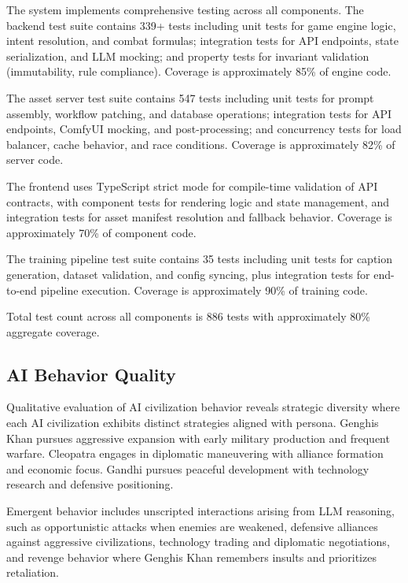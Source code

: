 \documentclass[conference]{IEEEtran}
\begin{document}
The system implements comprehensive testing across all components. The backend test suite contains 339+ tests including unit tests for game engine logic, intent resolution, and combat formulas; integration tests for API endpoints, state serialization, and LLM mocking; and property tests for invariant validation (immutability, rule compliance). Coverage is approximately 85\% of engine code.

The asset server test suite contains 547 tests including unit tests for prompt assembly, workflow patching, and database operations; integration tests for API endpoints, ComfyUI mocking, and post-processing; and concurrency tests for load balancer, cache behavior, and race conditions. Coverage is approximately 82\% of server code.

The frontend uses TypeScript strict mode for compile-time validation of API contracts, with component tests for rendering logic and state management, and integration tests for asset manifest resolution and fallback behavior. Coverage is approximately 70\% of component code.

The training pipeline test suite contains 35 tests including unit tests for caption generation, dataset validation, and config syncing, plus integration tests for end-to-end pipeline execution. Coverage is approximately 90\% of training code.

Total test count across all components is 886 tests with approximately 80\% aggregate coverage.

\subsection{AI Behavior Quality}

Qualitative evaluation of AI civilization behavior reveals strategic diversity where each AI civilization exhibits distinct strategies aligned with persona. Genghis Khan pursues aggressive expansion with early military production and frequent warfare. Cleopatra engages in diplomatic maneuvering with alliance formation and economic focus. Gandhi pursues peaceful development with technology research and defensive positioning.

Emergent behavior includes unscripted interactions arising from LLM reasoning, such as opportunistic attacks when enemies are weakened, defensive alliances against aggressive civilizations, technology trading and diplomatic negotiations, and revenge behavior where Genghis Khan remembers insults and prioritizes retaliation.
\end{document}
